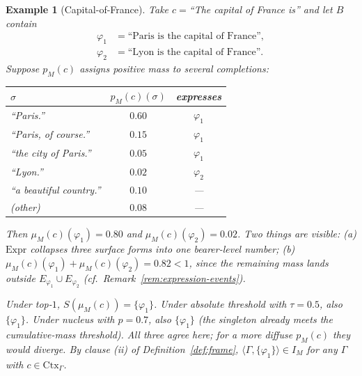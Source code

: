 \documentclass[11pt]{article}
\newtheorem{example}{Example}
\begin{document}
\begin{example}[Capital-of-France]
\label{ex:capital}
Take $c = {}$``The capital of France is'' and let $B$ contain
\begin{align*}
\varphi_1 &= \text{``Paris is the capital of France''},\\
\varphi_2 &= \text{``Lyon is the capital of France''}.
\end{align*}
Suppose $p_M(c)$ assigns positive mass to several completions:
\begin{center}
\begin{tabular}{lcc}
\hline
$\sigma$ & $p_M(c)(\sigma)$ & expresses\\
\hline
``Paris.'' & $0.60$ & $\varphi_1$\\
``Paris, of course.'' & $0.15$ & $\varphi_1$\\
``the city of Paris.'' & $0.05$ & $\varphi_1$\\
``Lyon.'' & $0.02$ & $\varphi_2$\\
``a beautiful country.'' & $0.10$ & ---\\
(other) & $0.08$ & ---\\
\hline
\end{tabular}
\end{center}
Then $\mu_M(c)(\varphi_1) = 0.80$ and $\mu_M(c)(\varphi_2) = 0.02$. Two things are visible: (a) $\mathrm{Expr}$ collapses three surface forms into one bearer-level number; (b) $\mu_M(c)(\varphi_1) + \mu_M(c)(\varphi_2) = 0.82 < 1$, since the remaining mass lands outside $E_{\varphi_1} \cup E_{\varphi_2}$ (cf.\ Remark~\ref{rem:expression-events}).

Under top-$1$, $S(\mu_M(c)) = \{\varphi_1\}$. Under absolute threshold with $\tau = 0.5$, also $\{\varphi_1\}$. Under nucleus with $p = 0.7$, also $\{\varphi_1\}$ (the singleton already meets the cumulative-mass threshold). All three agree here; for a more diffuse $p_M(c)$ they would diverge. By clause (ii) of Definition~\ref{def:frame}, $\langle \Gamma, \{\varphi_1\} \rangle \in I_M$ for any $\Gamma$ with $c \in \mathrm{Ctx}_\Gamma$.
\end{example}
\end{document}
